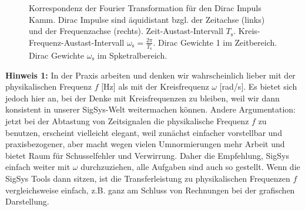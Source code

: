 \begin{figure}[h!]
\centering
%
%
%
%

\caption{Korrespondenz der Fourier Transformation für den Dirac Impuls Kamm.
Dirac Impulse sind äquidistant bzgl. der Zeitachse (links) und
der Frequenzachse (rechts). Zeit-Austast-Intervall $T_\mathrm{s}$.
Kreis-Frequenz-Austast-Intervall $\omega_\textrm{s}=\frac{2\pi}{T_\mathrm{s}}$.
%
Dirac Gewichte 1 im Zeitbereich. Dirac Gewichte $\omega_\text{s}$ im Spketralbereich.}
\label{fig:DiracImpulsKammSkizze}
\end{figure}


\textbf{Hinweis 1:} In der Praxis arbeiten und denken wir wahrscheinlich
lieber mit der physikalischen
Frequenz $f$ [Hz] als mit der Kreisfrequenz $\omega$ [rad/s]. Es bietet sich jedoch hier an, bei der Denke
mit Kreisfrequenzen zu bleiben, weil wir dann konsistent in unserer SigSys-Welt
weitermachen können. Andere Argumentation: jetzt bei der Abtastung von Zeitsignalen
die physikalische Frequenz $f$ zu benutzen, erscheint vielleicht elegant,
weil zunächst einfacher vorstellbar und praxisbezogener,
aber macht wegen vielen Umnormierungen mehr Arbeit und bietet Raum für
Schusselfehler und Verwirrung.
Daher die Empfehlung, SigSys einfach weiter mit $\omega$ durchzuziehen,
alle Aufgaben sind auch so gestellt. Wenn die SigSys Tools dann sitzen, ist die
Transferleistung zu physikalischen Frequenzen $f$ vergleichsweise einfach, z.B.
ganz am Schluss von Rechnungen bei der grafischen Darstellung.


